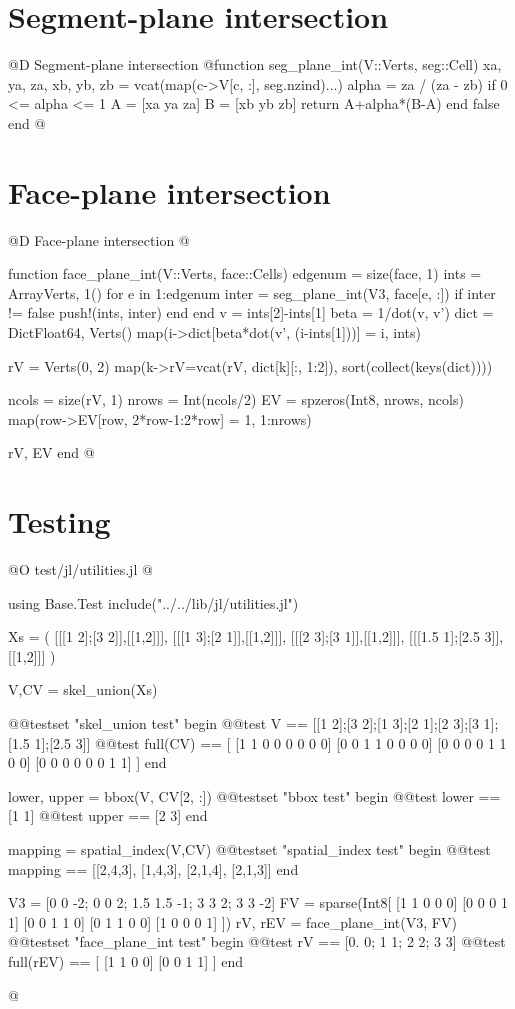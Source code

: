 \documentclass[10pt,oneside]{article}
\begin{document}
\section{Segment-plane intersection}
@D Segment-plane intersection
@{function seg_plane_int(V::Verts, seg::Cell)
    xa, ya, za, xb, yb, zb = vcat(map(c->V[c, :], seg.nzind)...)
    alpha = za / (za - zb)
    if 0 <= alpha <= 1
        A = [xa ya za]
        B = [xb yb zb]
        return A+alpha*(B-A)
    end
    false
end
@}


\section{Face-plane intersection}
@D Face-plane intersection
@{function face_plane_int(V::Verts, face::Cells)
    edgenum = size(face, 1)
    ints = Array{Verts, 1}()
    for e in 1:edgenum
        inter = seg_plane_int(V3, face[e, :])
        if inter != false
            push!(ints, inter)
        end
    end
    v = ints[2]-ints[1]
    beta = 1/dot(v, v')
    dict = Dict{Float64, Verts}()
    map(i->dict[beta*dot(v', (i-ints[1]))] = i, ints)
    
    rV = Verts(0, 2)
    map(k->rV=vcat(rV, dict[k][:, 1:2]), sort(collect(keys(dict))))

    ncols = size(rV, 1)
    nrows = Int(ncols/2)
    EV = spzeros(Int8, nrows, ncols)
    map(row->EV[row, 2*row-1:2*row] = 1, 1:nrows)

    rV, EV
end
@}


\section{Testing}
@O test/jl/utilities.jl
@{using Base.Test
include("../../lib/jl/utilities.jl")

Xs = (
    [[[1 2];[3 2]],[[1,2]]],
    [[[1 3];[2 1]],[[1,2]]],
    [[[2 3];[3 1]],[[1,2]]],
    [[[1.5 1];[2.5 3]],[[1,2]]]
)

V,CV = skel_union(Xs)

@@testset "skel_union test" begin
    @@test V == [[1 2];[3 2];[1 3];[2 1];[2 3];[3 1];[1.5 1];[2.5 3]]
    @@test full(CV) == [
        [1 1 0 0 0 0 0 0]
        [0 0 1 1 0 0 0 0]
        [0 0 0 0 1 1 0 0]
        [0 0 0 0 0 0 1 1]
    ]
end

lower, upper = bbox(V, CV[2, :])
@@testset "bbox test" begin
    @@test lower == [1 1]
    @@test upper == [2 3]
end

mapping = spatial_index(V,CV)
@@testset "spatial_index test" begin
    @@test mapping == [[2,4,3], [1,4,3], [2,1,4], [2,1,3]]
end

V3 = [0 0 -2; 0 0 2; 1.5 1.5 -1; 3 3 2; 3 3 -2]
FV = sparse(Int8[
    [1 1 0 0 0]
    [0 0 0 1 1]
    [0 0 1 1 0]
    [0 1 1 0 0]
    [1 0 0 0 1]
])
rV, rEV = face_plane_int(V3, FV)
@@testset "face_plane_int test" begin
    @@test rV == [0. 0; 1 1; 2 2; 3 3]
    @@test full(rEV) == [
        [1 1 0 0]
        [0 0 1 1]
    ]
end

@}
\end{document}
